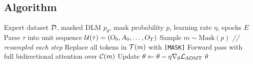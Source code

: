 \subsection{Algorithm}

\begin{algorithm}[h]
  \caption{Any-Order Masked Training (\aomt{})}
  \label{alg:aomt}
  \begin{algorithmic}[1]
    \REQUIRE Expert dataset $\mathcal{D}$, masked DLM $p_\theta$,
             mask probability $p$, learning rate $\eta$, epochs $E$
        \STATE Parse $\tau$ into unit sequence $\mathcal{U}(\tau) = (O_0, A_0, \ldots, O_T)$
        \STATE Sample $m \sim \mathrm{Mask}(p)$ \hfill\textit{// resampled each step}
        \STATE Replace all tokens in $\mathcal{T}(m)$ with \texttt{[MASK]}
        \STATE Forward pass with full bidirectional attention over $\mathcal{C}(m)$
        \STATE Update $\theta \leftarrow \theta - \eta\nabla_\theta\mathcal{L}_{\text{AOMT}}$
      \ENDFOR
    \ENDFOR
    \RETURN $\theta$
  \end{algorithmic}
\end{algorithm}
